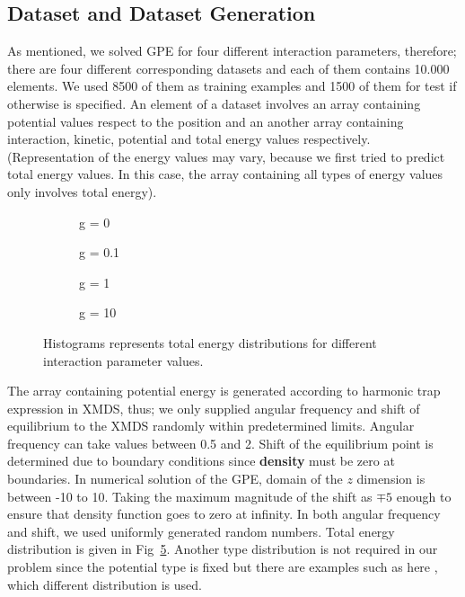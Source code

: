 \documentclass[a4paper,times,12pt]{article}
\begin{document}
\subsection{Dataset and Dataset Generation}

As mentioned, we solved GPE for four different interaction parameters, therefore; there are four different corresponding datasets and each of them contains 10.000 elements. We used 8500 of them as training examples and 1500 of them for test if otherwise is specified. An element of a dataset involves an array containing potential values respect to the position and an another array containing interaction, kinetic, potential and total energy values respectively. (Representation of the energy values may vary, because we first tried to predict total energy values. In this case, the array containing all types of energy values only involves total energy).

\begin{figure}[H]
    \centering
    \begin{subfigure}[t]{0.45\textwidth}
        
        \caption{g = 0}
		\label{fig:a}
    \end{subfigure}
    \begin{subfigure}[t]{0.45\textwidth}
        
        \caption{g = 0.1}
		\label{fig:b}
    \end{subfigure}
    \begin{subfigure}[t]{0.45\textwidth}
        
        \caption{g = 1}
		\label{fig:c}
    \end{subfigure}
    \begin{subfigure}[t]{0.45\textwidth}
        
        \caption{g = 10}
		\label{fig:d}
    \end{subfigure}
    \caption{Histograms represents total energy distributions for different interaction parameter values.}
\label{fig:energy_dist}
\end{figure}


The array containing potential energy is generated according to harmonic trap expression in XMDS, thus; we only supplied angular frequency and shift of equilibrium to the XMDS randomly within predetermined limits. Angular frequency can take values between 0.5 and 2. Shift of the equilibrium point is determined due to boundary conditions since \textbf{density} must be zero at boundaries. In numerical solution of the GPE, domain of the $z$ dimension is between -10 to 10. Taking the maximum magnitude of the shift as $\mp 5$ enough to ensure that density function goes to zero at infinity. In both angular frequency and shift, we used uniformly generated random numbers. Total energy distribution is given in Fig~\ref{fig:energy_dist}. Another type distribution is not required in our problem since the potential type is fixed but there are examples such as here \cite{mills2017deep}, which different distribution is used.
\end{document}
